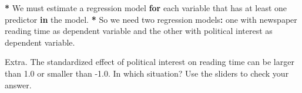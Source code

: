 \documentclass[a4paper]{book}
\newenvironment{Shaded}{\begin{snugshade}}{\end{snugshade}}
\newcommand{\StringTok}[1]{\textcolor[rgb]{0.00,0.00,0.00}{#1}}
\newcommand{\ControlFlowTok}[1]{\textcolor[rgb]{0.00,0.00,0.00}{\textbf{#1}}}
\newcommand{\OperatorTok}[1]{\textcolor[rgb]{0.00,0.00,0.00}{\textbf{#1}}}
\newcommand{\NormalTok}[1]{#1}
\theoremstyle{definition}
\theoremstyle{definition}
\theoremstyle{definition}
\theoremstyle{remark}
\begin{document}
\begin{Shaded}
\begin{Highlighting}[]
\OperatorTok{*}\StringTok{ }\NormalTok{We must estimate a regression model }\ControlFlowTok{for}\NormalTok{ each variable that has at least one}
\NormalTok{predictor }\ControlFlowTok{in}\NormalTok{ the model.}
\OperatorTok{*}\StringTok{ }\NormalTok{So we need two regression models}\OperatorTok{:}\StringTok{ }\NormalTok{one with newspaper reading time as}
\NormalTok{dependent variable and the other with political interest as dependent}
\NormalTok{variable.}
\end{Highlighting}
\end{Shaded}

Extra. The standardized effect of political interest on reading time can
be larger than 1.0 or smaller than -1.0. In which situation? Use the
sliders to check your answer.
\end{document}
